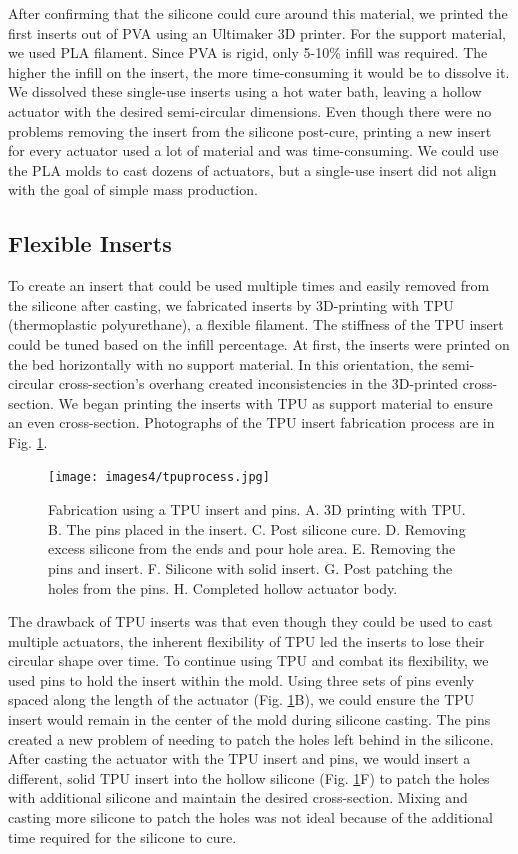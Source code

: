 After confirming that the silicone could cure around this material, we printed the first inserts out of PVA using an Ultimaker 3D printer. For the support material, we used PLA filament. Since PVA is rigid, only 5-10\% infill was required. The higher the infill on the insert, the more time-consuming it would be to dissolve it. We dissolved these single-use inserts using a hot water bath, leaving a hollow actuator with the desired semi-circular dimensions. Even though there were no problems removing the insert from the silicone post-cure, printing a new insert for every actuator used a lot of material and was time-consuming. We could use the PLA molds to cast dozens of actuators, but a single-use insert did not align with the goal of simple mass production.

\subsection{Flexible Inserts}

To create an insert that could be used multiple times and easily removed from the silicone after casting, we fabricated inserts by 3D-printing with TPU (thermoplastic polyurethane), a flexible filament. The stiffness of the TPU insert could be tuned based on the infill percentage. At first, the inserts were printed on the bed horizontally with no support material. In this orientation, the semi-circular cross-section's overhang created inconsistencies in the 3D-printed cross-section. We began printing the inserts with TPU as support material to ensure an even cross-section. Photographs of the TPU insert fabrication process are in Fig. \ref{fig:tpuprocess}. \\

\begin{figure}[!ht]
    \centering
    \texttt{[image: images4/tpuprocess.jpg]}
    \caption{Fabrication using a TPU insert and pins. A. 3D printing with TPU. B. The pins placed in the insert.  C. Post silicone cure. D. Removing excess silicone from the ends and pour hole area. E. Removing the pins and insert. F. Silicone with solid insert. G. Post patching the holes from the pins. H. Completed hollow actuator body.}
    \label{fig:tpuprocess}
\end{figure}

The drawback of TPU inserts was that even though they could be used to cast multiple actuators, the inherent flexibility of TPU led the inserts to lose their circular shape over time. To continue using TPU and combat its flexibility, we used pins to hold the insert within the mold. Using three sets of pins evenly spaced along the length of the actuator (Fig. \ref{fig:tpuprocess}B), we could ensure the TPU insert would remain in the center of the mold during silicone casting. The pins created a new problem of needing to patch the holes left behind in the silicone. After casting the actuator with the TPU insert and pins, we would insert a different, solid TPU insert into the hollow silicone (Fig. \ref{fig:tpuprocess}F) to patch the holes with additional silicone and maintain the desired cross-section. Mixing and casting more silicone to patch the holes was not ideal because of the additional time required for the silicone to cure. 

